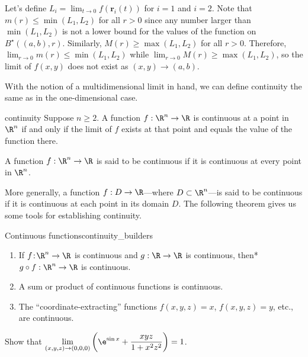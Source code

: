 \documentclass{watsonbook}
\begin{document}
\begin{solution}[title=Proof]
  Let's define $L_i = \lim_{t \to 0}f(\mathbf{r}_i(t))$ for $i=1$ and
  $i=2$. Note that $m(r) \leq \min(L_1,L_2)$ for all $r > 0$ since any
  number larger than $\min(L_1,L_2)$ is not a lower bound for the
  values of the function on $B^\star((a,b),r)$. Similarly,
  $M(r) \geq \max(L_1,L_2)$ for all $r > 0$. Therefore,
  $\lim_{r\to 0} m(r) \leq \min(L_1, L_2)$ while
  $\lim_{r\to 0} M(r) \geq \max(L_1,L_2)$, so the limit of $f(x,y)$ does not
  exist as $(x,y) \to (a,b)$.

\end{solution}

With the notion of a multidimensional limit in hand, we can define
continuity the same as in the one-dimensional case.

\begin{defn}{}{continuity}
  Suppose $n \geq 2$. A function $f: \R^n \to \R$ is continuous at a
  point in $\R^n$ if and only if the limit of $f$ exists at that point
  and equals the value of the function there.

  A function $f: \R^n \to \R$ is said to be continuous if it is
  continuous at every point in $\R^n$.
\end{defn}

More generally, a function $f:D \to \R$---where $D \subset \R^n$---is
said to be continuous if it is continuous at each point in its
domain $D$. The following theorem gives us some tools for establishing
continuity. 

\begin{theo}{Continuous functions}{continuity_builders}
  \begin{enumerate}[leftmargin = 12pt]
  \item If $f  \!:\! \R^n \to \R$ is continuous and $g: \R \to \R$
    is continuous, then* $g\circ f :\R^n \to \R$ is
    continuous. 
  \item A sum or product of continuous functions is continuous. 
  \item The ``coordinate-extracting'' functions $f(x,y,z) = x$, $f(x,y,z) = y$, etc., are
    continuous.
  \end{enumerate}
\end{theo}

\begin{example}{}{}
  Show that $\displaystyle{\lim_{(x,y,z) \to (0,0,0)}\left(\e^{\sin x} + \frac{xyz}{1 + x^2
        z^2}\right)} = 1$. 
\end{example}
\end{document}
